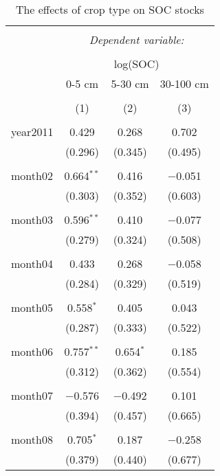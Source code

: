 
\begin{table}[!htbp] \centering 
  \caption{The effects of crop type on SOC stocks} 
  \label{} 
\begin{tabular}{@{\extracolsep{5pt}}lccc} 
\\[-1.8ex]\hline 
\hline \\[-1.8ex] 
 & \multicolumn{3}{c}{\textit{Dependent variable:}} \\ 
\cline{2-4} 
\\[-1.8ex] & \multicolumn{3}{c}{log(SOC)} \\ 
 & 0-5 cm & 5-30 cm & 30-100 cm \\ 
\\[-1.8ex] & (1) & (2) & (3)\\ 
\hline \\[-1.8ex] 
 year2011 & 0.429 & 0.268 & 0.702 \\ 
  & (0.296) & (0.345) & (0.495) \\ 
  & & & \\ 
 month02 & 0.664$^{**}$ & 0.416 & $-$0.051 \\ 
  & (0.303) & (0.352) & (0.603) \\ 
  & & & \\ 
 month03 & 0.596$^{**}$ & 0.410 & $-$0.077 \\ 
  & (0.279) & (0.324) & (0.508) \\ 
  & & & \\ 
 month04 & 0.433 & 0.268 & $-$0.058 \\ 
  & (0.284) & (0.329) & (0.519) \\ 
  & & & \\ 
 month05 & 0.558$^{*}$ & 0.405 & 0.043 \\ 
  & (0.287) & (0.333) & (0.522) \\ 
  & & & \\ 
 month06 & 0.757$^{**}$ & 0.654$^{*}$ & 0.185 \\ 
  & (0.312) & (0.362) & (0.554) \\ 
  & & & \\ 
 month07 & $-$0.576 & $-$0.492 & 0.101 \\ 
  & (0.394) & (0.457) & (0.665) \\ 
  & & & \\ 
 month08 & 0.705$^{*}$ & 0.187 & $-$0.258 \\ 
  & (0.379) & (0.440) & (0.677) \\ 

\end{tabular}
\end{table}
